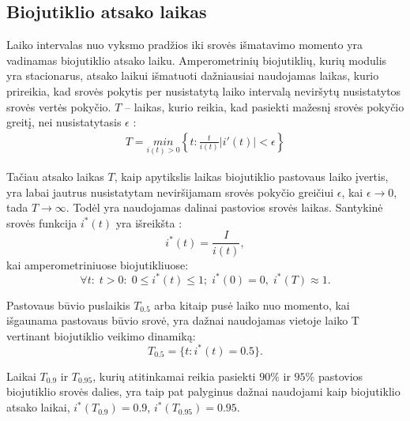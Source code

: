 \documentclass[12pt, a4paper, lithuanian]{article}
\begin{document}
\subsection{Biojutiklio atsako laikas}

Laiko intervalas nuo vyksmo pradžios iki srovės išmatavimo momento yra
vadinamas biojutiklio atsako laiku. Amperometrinių biojutiklių, kurių modulis
yra stacionarus, atsako laikui išmatuoti dažniausiai naudojamas laikas, kurio
prireikia, kad srovės pokytis per nusistatytą laiko intervalą neviršytų
nusistatytos srovės vertės pokyčio. $T$ – laikas, kurio reikia, kad pasiekti
mažesnį srovės pokyčio greitį, nei nusistatytasis $\epsilon$ \cite{baronas2009mathematical}:
\begin{equation} 
\begin{aligned}
    T = \underset{i(t)>0}{min}\left\{t:\frac{t}{i(t)} \left| i'(t)
    \right| < \epsilon \right\}
\end{aligned}
\end{equation}

Tačiau atsako laikas $T$, kaip apytikslis laikas biojutiklio pastovaus laiko
įvertis, yra labai jautrus nusistatytam neviršijamam srovės pokyčio greičiui
$\epsilon$, kai $\epsilon \to 0$, tada $T \to \infty$. Todėl yra naudojamas
dalinai pastovios srovės laikas. Santykinė srovės
funkcija $i^*(t)$ yra išreikšta \cite{baronas2009mathematical}:
\begin{equation}
    i^*(t) = \frac{I}{i(t)},
\end{equation}
kai amperometriniuose biojutikliuose:
\begin{equation}
    \forall t: \; t > 0 :\; 0 \leq i^*(t)\leq 1;\; i^*(0) = 0,\; i^*(T)\approx
    1.
\end{equation}

Pastovaus būvio puslaikis $T_{0.5}$ arba kitaip pusė laiko nuo momento, kai
išgaunama pastovaus būvio srovė, yra dažnai naudojamas vietoje laiko T
vertinant biojutiklio veikimo dinamiką:
\begin{equation}
    T_{0.5}=\{t:i^*(t)=0.5\}.
\end{equation}

Laikai $T_{0.9}$ ir $T_{0.95}$, kurių atitinkamai reikia pasiekti $90\%$ ir $95\%$
pastovios biojutiklio srovės dalies, yra taip pat palyginus dažnai naudojami
kaip biojutiklio atsako laikai, $i^*(T_{0.9}) = 0.9$, $i^*(T_{0.95}) = 0.95$. 
\end{document}
